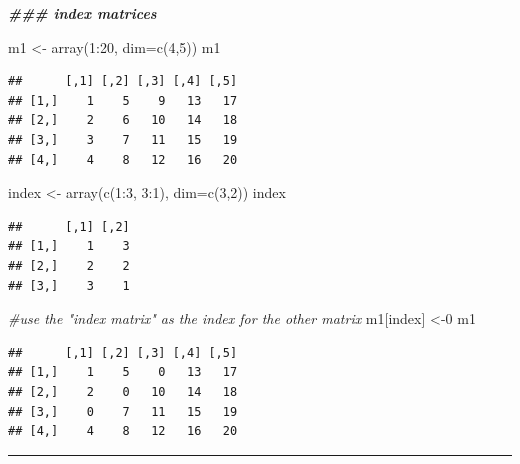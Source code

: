 \documentclass[
]{book}
\newenvironment{Shaded}{\begin{snugshade}}{\end{snugshade}}
\newcommand{\AttributeTok}[1]{\textcolor[rgb]{0.77,0.63,0.00}{#1}}
\newcommand{\CommentTok}[1]{\textcolor[rgb]{0.56,0.35,0.01}{\textit{#1}}}
\newcommand{\DecValTok}[1]{\textcolor[rgb]{0.00,0.00,0.81}{#1}}
\newcommand{\DocumentationTok}[1]{\textcolor[rgb]{0.56,0.35,0.01}{\textbf{\textit{#1}}}}
\newcommand{\FunctionTok}[1]{\textcolor[rgb]{0.00,0.00,0.00}{#1}}
\newcommand{\NormalTok}[1]{#1}
\newcommand{\OtherTok}[1]{\textcolor[rgb]{0.56,0.35,0.01}{#1}}
\newcommand{\SpecialCharTok}[1]{\textcolor[rgb]{0.00,0.00,0.00}{#1}}
\begin{document}
\begin{Shaded}
\begin{Highlighting}[]
\DocumentationTok{\#\#\# index matrices}

\NormalTok{m1 }\OtherTok{\textless{}{-}} \FunctionTok{array}\NormalTok{(}\DecValTok{1}\SpecialCharTok{:}\DecValTok{20}\NormalTok{, }\AttributeTok{dim=}\FunctionTok{c}\NormalTok{(}\DecValTok{4}\NormalTok{,}\DecValTok{5}\NormalTok{))}
\NormalTok{m1}
\end{Highlighting}
\end{Shaded}

\begin{verbatim}
##      [,1] [,2] [,3] [,4] [,5]
## [1,]    1    5    9   13   17
## [2,]    2    6   10   14   18
## [3,]    3    7   11   15   19
## [4,]    4    8   12   16   20
\end{verbatim}

\begin{Shaded}
\begin{Highlighting}[]
\NormalTok{index }\OtherTok{\textless{}{-}} \FunctionTok{array}\NormalTok{(}\FunctionTok{c}\NormalTok{(}\DecValTok{1}\SpecialCharTok{:}\DecValTok{3}\NormalTok{, }\DecValTok{3}\SpecialCharTok{:}\DecValTok{1}\NormalTok{), }\AttributeTok{dim=}\FunctionTok{c}\NormalTok{(}\DecValTok{3}\NormalTok{,}\DecValTok{2}\NormalTok{))}
\NormalTok{index}
\end{Highlighting}
\end{Shaded}

\begin{verbatim}
##      [,1] [,2]
## [1,]    1    3
## [2,]    2    2
## [3,]    3    1
\end{verbatim}

\begin{Shaded}
\begin{Highlighting}[]
\CommentTok{\#use the "index matrix" as the index for the other matrix}
\NormalTok{m1[index] }\OtherTok{\textless{}{-}}\DecValTok{0}
\NormalTok{m1}
\end{Highlighting}
\end{Shaded}

\begin{verbatim}
##      [,1] [,2] [,3] [,4] [,5]
## [1,]    1    5    0   13   17
## [2,]    2    0   10   14   18
## [3,]    0    7   11   15   19
## [4,]    4    8   12   16   20
\end{verbatim}

\begin{center}\rule{0.5\linewidth}{0.5pt}\end{center}
\end{document}
